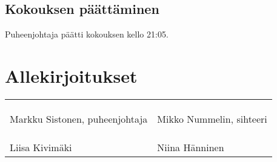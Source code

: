 \documentclass[a4paper,12pt]{article}
\begin{document}
\subsection{Kokouksen päättäminen}
Puheenjohtaja päätti kokouksen kello 21:05.
\section*{Allekirjoitukset}
\begin{flushleft}
\begin{tabular}{ll}
& \\
& \\
& \\
Markku Sistonen, puheenjohtaja &
Mikko Nummelin, sihteeri \\
& \\
& \\
& \\
Liisa Kivimäki &
Niina Hänninen
\end{tabular}
\end{flushleft}
\end{document}
